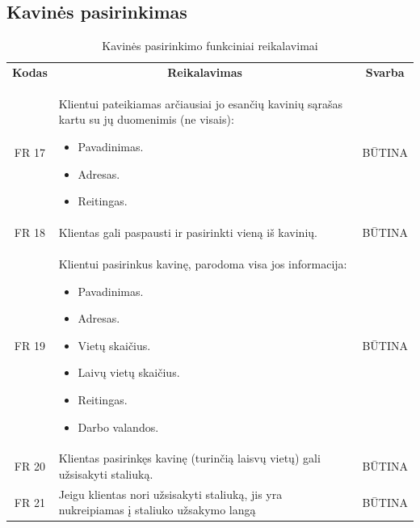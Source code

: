 \documentclass{VUMIFPSkursinis}
\begin{document}
\subsection{Kavinės pasirinkimas}

\begin{center}
	\begin{table}[H]
	\caption{Kavinės pasirinkimo funkciniai reikalavimai}
	\begin{tabular}{|p{2cm}|p{}|p{}|}
	
	\hline
	    \rowcolor{lightgray}
		\multicolumn{3}{|c|}{Kavinės pasirinkimas}\\
		
	\hline
		\multicolumn{1}{|c|}{{\bfseries Kodas}}&
		\multicolumn{1}{|c|}{{\bfseries Reikalavimas}}&
		\multicolumn{1}{|c|}{{\bfseries Svarba}}\\

	\hline
	
		\multicolumn{1}{|c|}{FR 17}&
		{Klientui pateikiamas arčiausiai jo esančių kavinių sąrašas kartu su jų duomenimis (ne visais):
		\begin{itemize}
			\item Pavadinimas.
			\item Adresas.
			\item Reitingas.
		\end{itemize}}&
		\multicolumn{1}{|c|}{BŪTINA}\\	
		
	\hline
	
		\multicolumn{1}{|c|}{FR 18}&
		{Klientas gali paspausti ir pasirinkti vieną iš kavinių.}&
		\multicolumn{1}{|c|}{BŪTINA}\\
		
	\hline
	
		\multicolumn{1}{|c|}{FR 19}&
		{Klientui pasirinkus kavinę, parodoma visa jos informacija:
		\begin{itemize}
			\item Pavadinimas.
			\item Adresas.
			\item Vietų skaičius.
			\item Laivų vietų skaičius.
			\item Reitingas.
			\item Darbo valandos.
		\end{itemize}}&
		\multicolumn{1}{|c|}{BŪTINA}\\
		
	\hline
	
		\multicolumn{1}{|c|}{FR 20}&
		{Klientas pasirinkęs kavinę (turinčią laisvų vietų) gali užsisakyti staliuką.}&
		\multicolumn{1}{|c|}{BŪTINA}\\
	\hline
	
		\multicolumn{1}{|c|}{FR 21}&
		{Jeigu klientas nori užsisakyti staliuką, jis yra nukreipiamas į staliuko užsakymo langą}&
		\multicolumn{1}{|c|}{BŪTINA}\\				
	\hline
	
	\end{tabular}		
	
	\label{table:KavinėsPasirinkimas}
	\end{table}


\end{center}
\end{document}
